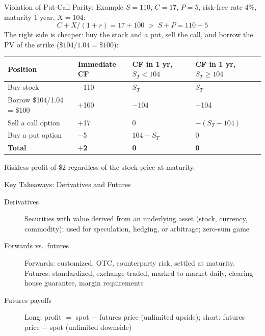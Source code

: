 \documentclass[aspectratio=169]{beamer}
\begin{document}
\begin{frame}{Violation of Put-Call Parity: Example}
$S = 110$, $C = 17$, $P = 5$, risk-free rate 4\%, maturity 1 year, $X = 104$:
\begin{equation*}
C + X/(1+r) = 17 + 100 \;>\; S + P = 110 + 5
\end{equation*}
The right side is cheaper: buy the stock and a put, sell the call, and borrow the PV of the strike ($\$104/1.04 = \$100$):
\begin{center}
\small
\begin{tabular}{p{}p{}p{}p{}}
\toprule
\textbf{Position} & \textbf{Immediate CF} & \textbf{CF in 1 yr, $S_T < 104$} & \textbf{CF in 1 yr, $S_T \ge 104$} \\
\midrule
Buy stock & $-$110 & $S_T$ & $S_T$ \\
Borrow \$104/1.04 = \$100 & $+$100 & $-$104 & $-$104 \\
Sell a call option & $+$17 & 0 & $-(S_T - 104)$ \\
Buy a put option & $-$5 & $104 - S_T$ & 0 \\
\midrule
\textbf{Total} & \textbf{$+$2} & \textbf{0} & \textbf{0} \\
\bottomrule
\end{tabular}
\end{center}
Riskless profit of \$2 regardless of the stock price at maturity.
\end{frame}

\begin{frame}{Key Takeaways: Derivatives and Futures}
\begin{description}
  \item[Derivatives] Securities with value derived from an underlying asset (stock, currency, commodity); used for speculation, hedging, or arbitrage; zero-sum game
  \item[Forwards vs.\ futures] Forwards: customized, OTC, counterparty risk, settled at maturity. Futures: standardized, exchange-traded, marked to market daily, clearing-house guarantee, margin requirements
  \item[Futures payoffs] Long: profit $=$ spot $-$ futures price (unlimited upside); short: futures price $-$ spot (unlimited downside)
\end{description}
\end{frame}
\end{document}
